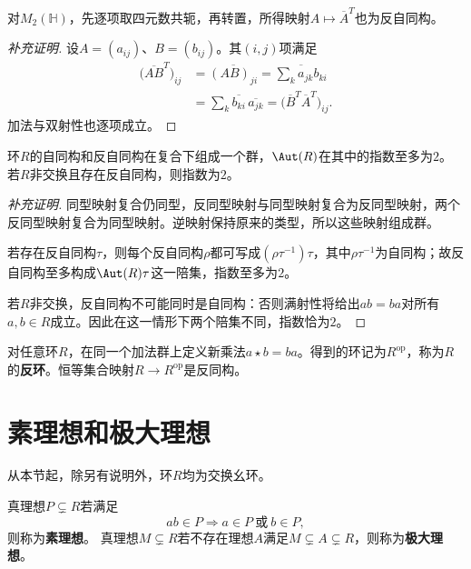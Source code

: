 \begin{example}
对$M_2(\mathbb H)$，先逐项取四元数共轭，再转置，所得映射$A\mapsto\overline A^{T}$也为反自同构。
\end{example}
\begin{proof}[补充证明]
设$A=(a_{ij})$、$B=(b_{ij})$。其$(i,j)$项满足
\begin{align*}
\bigl(\overline{AB}^{T}\bigr)_{ij}
&=\overline{(AB)_{ji}}
=\overline{\sum_k a_{jk}b_{ki}}\\
&=\sum_k\overline{b_{ki}}\,\overline{a_{jk}}
=\bigl(\overline B^{T}\overline A^{T}\bigr)_{ij}.
\end{align*}
加法与双射性也逐项成立。
\end{proof}

\begin{proposition}
环$R$的自同构和反自同构在复合下组成一个群，$\Aut(R)$在其中的指数至多为$2$。若$R$非交换且存在反自同构，则指数为$2$。
\end{proposition}
\begin{proof}[补充证明]
同型映射复合仍同型，反同型映射与同型映射复合为反同型映射，两个反同型映射复合为同型映射。逆映射保持原来的类型，所以这些映射组成群。

若存在反自同构$\tau$，则每个反自同构$\rho$都可写成$(\rho\tau^{-1})\tau$，其中$\rho\tau^{-1}$为自同构；故反自同构至多构成$\Aut(R)\tau$这一陪集，指数至多为$2$。

若$R$非交换，反自同构不可能同时是自同构：否则满射性将给出$ab=ba$对所有$a,b\in R$成立。因此在这一情形下两个陪集不同，指数恰为$2$。
\end{proof}

\begin{definition}
对任意环$R$，在同一个加法群上定义新乘法$a\star b=ba$。得到的环记为$R^{\mathrm{op}}$，称为$R$的\textbf{反环}。恒等集合映射$R\to R^{\mathrm{op}}$是反同构。
\end{definition}

\section{素理想和极大理想}

从本节起，除另有说明外，环$R$均为交换幺环。
\begin{definition}
真理想$P\subsetneq R$若满足
\[
ab\in P\Longrightarrow a\in P\ \text{或}\ b\in P,
\]
则称为\textbf{素理想}。
真理想$M\subsetneq R$若不存在理想$A$满足$M\subsetneq A\subsetneq R$，则称为\textbf{极大理想}。
\end{definition}

